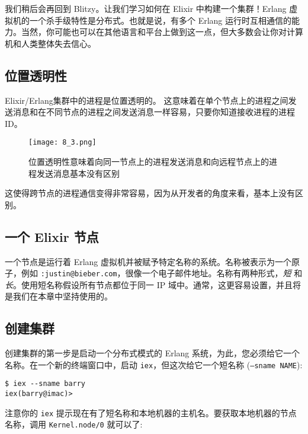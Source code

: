 我们稍后会再回到 Blitzy。让我们学习如何在 Elixir 中构建一个集群！Erlang
虚拟机的一个杀手级特性是分布式。也就是说，有多个 Erlang
运行时互相通信的能力。当然，你可能也可以在其他语言和平台上做到这一点，但大多数会让你对计算机和人类整体失去信心。

\subsection{位置透明性}

Elixir/Erlang集群中的进程是位置透明的。
这意味着在单个节点上的进程之间发送消息和在不同节点的进程之间发送消息一样容易，只要你知道接收进程的进程ID。

\begin{figure}[!ht]
    \centering
    \texttt{[image: 8\_3.png]}
    \caption{位置透明性意味着向同一节点上的进程发送消息和向远程节点上的进程发送消息基本没有区别}
    \label{fig:8_3}
\end{figure}



这使得跨节点的进程通信变得非常容易，因为从开发者的角度来看，基本上没有区别。


\subsection{一个 Elixir 节点}

一个节点是运行着 Erlang
虚拟机并被赋予特定名称的系统。名称被表示为一个原子，例如
\texttt{:justin@bieber.com}，很像一个电子邮件地址。名称有两种形式，\emph{短}
和 \emph{长}。使用短名称假设所有节点都位于同一 IP
域中。通常，这更容易设置，并且将是我们在本章中坚持使用的。

 \subsection{ 创建集群}

创建集群的第一步是启动一个分布式模式的 Erlang
系统，为此，您必须给它一个名称。在一个新的终端窗口中，启动
\texttt{iex}，但这次给它一个短名称
(\texttt{--sname NAME}):

\begin{code}{}
\begin{verbatim}
$ iex --sname barry
iex(barry@imac)>
\end{verbatim}
\end{code}

注意你的 \texttt{iex}
提示现在有了短名称和本地机器的主机名。要获取本地机器的节点名称，调用
\texttt{Kernel.node/0} 就可以了:


